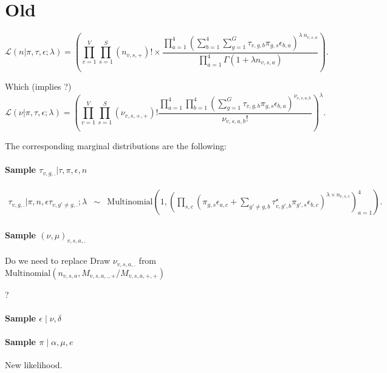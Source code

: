 \documentclass{article}
\begin{document}
\section{Old}


$$\mathcal{L}\left(n| \pi, \tau,\epsilon;\lambda \right) =\left( \prod_{v=1}^{V} \prod_{s = 1}^{S} (n_{v,s,+})!\times\frac{\prod_{a = 1}^{4} \left(\sum_{b=1}^{4} \sum_{g = 1}^{G} \tau_{v,g,b} \pi_{g,s} \epsilon_{b,a} \right)^{\lambda~n_{v,s,a}}}{\prod_{a = 1}^{4}\Gamma(1+\lambda n_{v,s,a})}\right). $$

Which (implies ?)
$$\mathcal{L}\left(\nu| \pi, \tau,\epsilon;\lambda \right) =\left( \prod_{v=1}^{V} \prod_{s = 1}^{S} (\nu_{v,s,+,+})!\frac{\prod_{a = 1}^{4} \prod_{b=1}^{4} \left(\sum_{g = 1}^{G} \tau_{v,g,b} \pi_{g,s} \epsilon_{b,a} \right)^{\nu_{v,s,a,b}}}{\nu_{v,s,a,b}!}\right)^\lambda. $$



The corresponding marginal distributions are the following:

\paragraph*{Sample $\tau_{v,g,.}|\tau,\pi,\epsilon,n$}
\begin{eqnarray*}
    \tau_{v,g,.}|\pi,n ,\epsilon \tau_{v,g'\neq g,.};\lambda&\sim&\mathrm{Multinomial}\left(1,\left(\prod_{s,c}      \left(\pi_{g,s}\epsilon_{a,c}+\sum_{g'\neq g,b}\tau^\star_{v,g',b}\pi_{g',s}\epsilon_{b,c}\right)^{ \lambda\times n_{v,s,c}}\right)_{a=1}^4\right). 
\end{eqnarray*}


\paragraph*{Sample $(\nu,\mu)_{v,s,a,.}$} 
Do we need to replace 
      Draw $\nu_{v,s,a,.}$ from $\mathrm{Multinomial}(n_{v,s,a},M_{v,s,a,.,+}/M_{v,s,a,+,+})$
     
     ?


\paragraph*{Sample $\epsilon\mid \nu,\delta$} 


\paragraph*{Sample $\pi \mid \alpha,\mu,e$} 


New likelihood.
\end{document}
